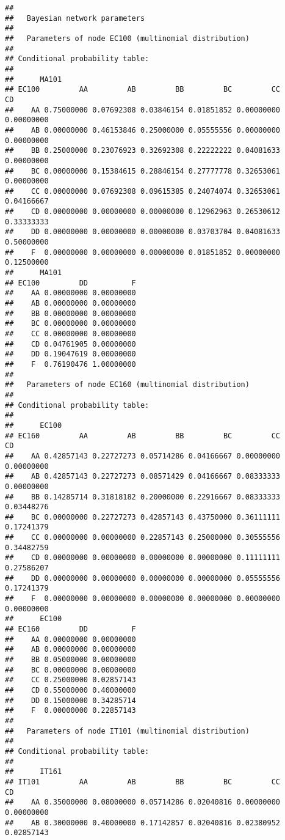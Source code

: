 \documentclass[
]{article}
\begin{document}
\begin{verbatim}
## 
##   Bayesian network parameters
## 
##   Parameters of node EC100 (multinomial distribution)
## 
## Conditional probability table:
##  
##      MA101
## EC100         AA         AB         BB         BC         CC         CD
##    AA 0.75000000 0.07692308 0.03846154 0.01851852 0.00000000 0.00000000
##    AB 0.00000000 0.46153846 0.25000000 0.05555556 0.00000000 0.00000000
##    BB 0.25000000 0.23076923 0.32692308 0.22222222 0.04081633 0.00000000
##    BC 0.00000000 0.15384615 0.28846154 0.27777778 0.32653061 0.00000000
##    CC 0.00000000 0.07692308 0.09615385 0.24074074 0.32653061 0.04166667
##    CD 0.00000000 0.00000000 0.00000000 0.12962963 0.26530612 0.33333333
##    DD 0.00000000 0.00000000 0.00000000 0.03703704 0.04081633 0.50000000
##    F  0.00000000 0.00000000 0.00000000 0.01851852 0.00000000 0.12500000
##      MA101
## EC100         DD          F
##    AA 0.00000000 0.00000000
##    AB 0.00000000 0.00000000
##    BB 0.00000000 0.00000000
##    BC 0.00000000 0.00000000
##    CC 0.00000000 0.00000000
##    CD 0.04761905 0.00000000
##    DD 0.19047619 0.00000000
##    F  0.76190476 1.00000000
## 
##   Parameters of node EC160 (multinomial distribution)
## 
## Conditional probability table:
##  
##      EC100
## EC160         AA         AB         BB         BC         CC         CD
##    AA 0.42857143 0.22727273 0.05714286 0.04166667 0.00000000 0.00000000
##    AB 0.42857143 0.22727273 0.08571429 0.04166667 0.08333333 0.00000000
##    BB 0.14285714 0.31818182 0.20000000 0.22916667 0.08333333 0.03448276
##    BC 0.00000000 0.22727273 0.42857143 0.43750000 0.36111111 0.17241379
##    CC 0.00000000 0.00000000 0.22857143 0.25000000 0.30555556 0.34482759
##    CD 0.00000000 0.00000000 0.00000000 0.00000000 0.11111111 0.27586207
##    DD 0.00000000 0.00000000 0.00000000 0.00000000 0.05555556 0.17241379
##    F  0.00000000 0.00000000 0.00000000 0.00000000 0.00000000 0.00000000
##      EC100
## EC160         DD          F
##    AA 0.00000000 0.00000000
##    AB 0.00000000 0.00000000
##    BB 0.05000000 0.00000000
##    BC 0.00000000 0.00000000
##    CC 0.25000000 0.02857143
##    CD 0.55000000 0.40000000
##    DD 0.15000000 0.34285714
##    F  0.00000000 0.22857143
## 
##   Parameters of node IT101 (multinomial distribution)
## 
## Conditional probability table:
##  
##      IT161
## IT101         AA         AB         BB         BC         CC         CD
##    AA 0.35000000 0.08000000 0.05714286 0.02040816 0.00000000 0.00000000
##    AB 0.30000000 0.40000000 0.17142857 0.02040816 0.02380952 0.02857143

\end{verbatim}
\end{document}
